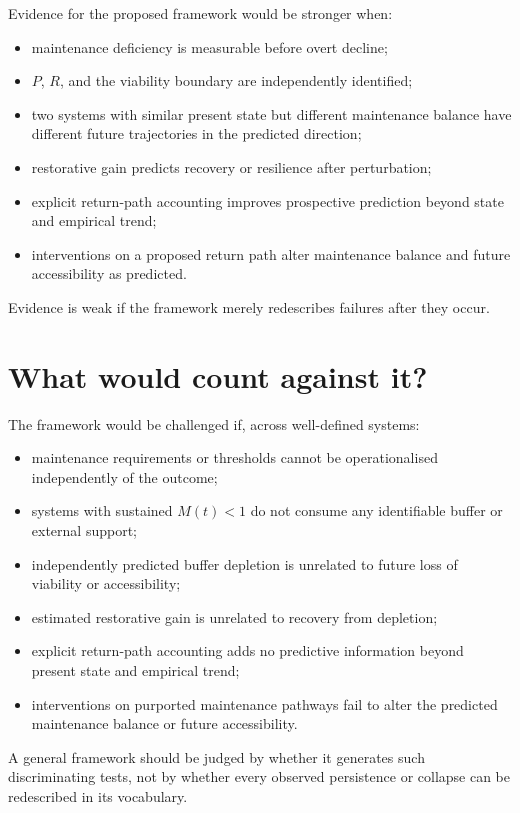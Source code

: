 \documentclass[11pt,a4paper]{article}
\begin{document}
Evidence for the proposed framework would be stronger when:
\begin{itemize}[nosep]
    \item maintenance deficiency is measurable before overt decline;
    \item $P$, $R$, and the viability boundary are independently identified;
    \item two systems with similar present state but different maintenance balance have different future trajectories in the predicted direction;
    \item restorative gain predicts recovery or resilience after perturbation;
    \item explicit return-path accounting improves prospective prediction beyond state and empirical trend;
    \item interventions on a proposed return path alter maintenance balance and future accessibility as predicted.
\end{itemize}

Evidence is weak if the framework merely redescribes failures after they occur.

\section{What would count against it?}

The framework would be challenged if, across well-defined systems:
\begin{itemize}[nosep]
    \item maintenance requirements or thresholds cannot be operationalised independently of the outcome;
    \item systems with sustained $M(t)<1$ do not consume any identifiable buffer or external support;
    \item independently predicted buffer depletion is unrelated to future loss of viability or accessibility;
    \item estimated restorative gain is unrelated to recovery from depletion;
    \item explicit return-path accounting adds no predictive information beyond present state and empirical trend;
    \item interventions on purported maintenance pathways fail to alter the predicted maintenance balance or future accessibility.
\end{itemize}

A general framework should be judged by whether it generates such discriminating tests, not by whether every observed persistence or collapse can be redescribed in its vocabulary.
\end{document}
